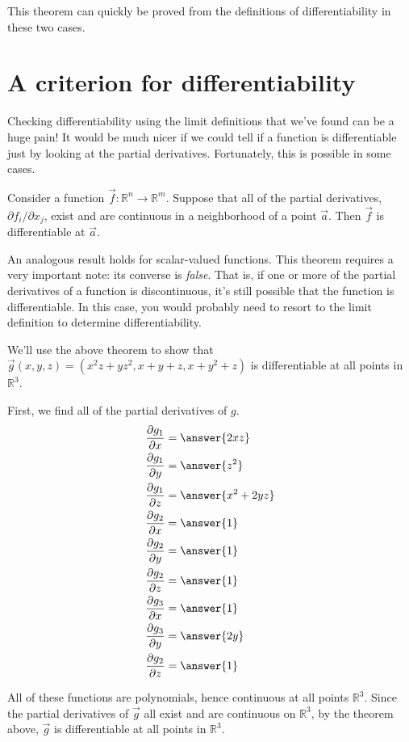 \documentclass{ximera}
\begin{document}
This theorem can quickly be proved from the definitions of differentiability in these two cases.

\section*{A criterion for differentiability}

Checking differentiability using the limit definitions that we've found can be a huge pain! It would be much nicer if we could tell if a function is differentiable just by looking at the partial derivatives. Fortunately, this is possible in some cases.

\begin{theorem}
Consider a function $\vec{f}:\mathbb{R}^n\rightarrow\mathbb{R}^m$. Suppose that all of the partial derivatives, $\partial f_i/\partial x_j$, exist and are continuous in a neighborhood of a point $\vec{a}$. Then $\vec{f}$ is differentiable at $\vec{a}$.
\end{theorem}

An analogous result holds for scalar-valued functions. This theorem requires a very important note: its converse is \emph{false}. That is, if one or more of the partial derivatives of a function is discontinuous, it's still possible that the function is differentiable. In this case, you would probably need to resort to the limit definition to determine differentiability.

\begin{example}
We'll use the above theorem to show that $\vec{g}(x,y,z) = (x^2z+yz^2, x+y+z, x+y^2+z)$ is differentiable at all points in $\mathbb{R}^3$.

First, we find all of the partial derivatives of $g$.
\begin{align*}
\frac{\partial g_1}{\partial x} &= \answer{2xz}\\
\frac{\partial g_1}{\partial y} &= \answer{z^2}\\
\frac{\partial g_1}{\partial z} &= \answer{x^2+2yz}\\
\frac{\partial g_2}{\partial x} &= \answer{1}\\
\frac{\partial g_2}{\partial y} &= \answer{1}\\
\frac{\partial g_2}{\partial z} &= \answer{1}\\
\frac{\partial g_3}{\partial x} &= \answer{1}\\
\frac{\partial g_3}{\partial y} &= \answer{2y}\\
\frac{\partial g_2}{\partial z} &= \answer{1}\\
\end{align*}

All of these functions are polynomials, hence continuous at all points $\mathbb{R}^3$. Since the partial derivatives of $\vec{g}$ all exist and are continuous on $\mathbb{R}^3$, by the theorem above, $\vec{g}$ is differentiable at all points in $\mathbb{R}^3$.
\end{example}
\end{document}
